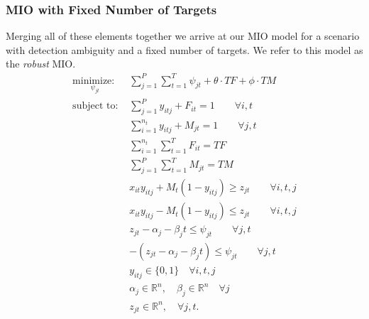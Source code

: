 \subsubsection{MIO with Fixed Number of Targets}
Merging all of these elements together we arrive at our MIO model for a scenario with detection ambiguity and a fixed number of targets. We refer to this model as the \textit{robust} MIO. 
\begin{align}
\underset{\psi_{jt}}{\text{minimize: }} & \sum_{j=1}^{P} \sum_{t=1}^{T} \psi_{jt} + \theta \cdot TF + \phi \cdot TM \label{eq:simple_robust}\\
\text{subject to: }	& \sum_{j=1}^{P} y_{itj} + F_{it} = 1 \qquad \forall i,t \nonumber \\
				& \sum_{i=1}^{n_{t}} y_{itj} + M_{jt} = 1 \qquad \forall j,t \nonumber\\
				& \sum_{i=1}^{n_{t}} \sum_{t=1}^{T} F_{it} = TF \nonumber \\
				& \sum_{j=1}^{P} \sum_{t=1}^{T} M_{jt} = TM \nonumber \\
				& x_{it}y_{itj} + M_{t}(1-y_{itj}) \geq z_{jt} \qquad \forall i,t,j \nonumber \\
				& x_{it}y_{itj} - M_{t}(1-y_{itj}) \leq z_{jt} \qquad \forall i,t,j \nonumber \\
				& z_{jt} - \alpha_{j} - \beta_{j}t \leq \psi_{jt} \qquad \forall j,t \nonumber \\
				& -(z_{jt} - \alpha_{j} - \beta_{j}t) \leq \psi_{jt} \qquad \forall j,t \nonumber \\
				& y_{itj} \in \{0,1\} \quad \forall i,t,j \nonumber \\
				& \alpha_{j} \in \mathbb{R}^n,\quad \beta_{j} \in \mathbb{R}^n \quad \forall j \nonumber\\
				& z_{jt} \in \mathbb{R}^n, \quad \forall j,t. \nonumber
\end{align}

